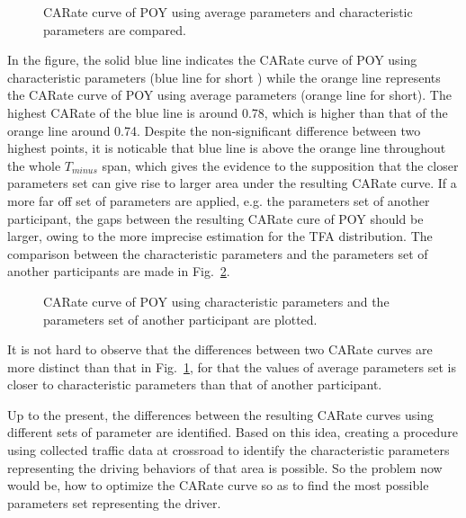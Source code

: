 \begin{figure}[htbp!]
\begin{center}
\end{center}
\caption{CARate curve of POY using average parameters and characteristic parameters are compared.}
\label{fig:CAR_comparison} 
\end{figure}


In the figure, the solid blue line indicates the CARate curve of POY using characteristic parameters (blue line for short ) while the orange line represents the CARate curve of POY using average parameters (orange line for short). The highest CARate of the blue line is around 0.78, which is higher than that of the orange line around 0.74. Despite the non-significant difference between two highest points, it is noticable that blue line is above the orange line throughout the whole $T_{minus}$ span, which gives the evidence to the supposition that the closer parameters set can give rise to larger area under the resulting CARate curve. If a more far off set of parameters are applied, e.g. the parameters set of another participant, the gaps between the resulting CARate cure of POY should be larger, owing to the more imprecise estimation for the TFA distribution. The comparison between the characteristic parameters and the parameters set of another participants are made in Fig.~\ref{fig:CAR_twoParticipants}.


\begin{figure}[htbp!]
\begin{center}
\end{center}
\caption{CARate curve of POY using characteristic parameters and the parameters set of another participant are plotted.}
\label{fig:CAR_twoParticipants} 
\end{figure}

It is not hard to observe that the differences between two CARate curves are more distinct than that in Fig.~\ref{fig:CAR_comparison}, for that the values of average parameters set is closer to characteristic parameters than that of another participant.

Up to the present, the differences between the resulting CARate curves using different sets of parameter are identified. Based on this idea, creating a procedure using collected traffic data at crossroad to identify the characteristic parameters representing the driving behaviors of that area is possible. So the problem now would be, how to optimize the CARate curve so as to find the most possible parameters set representing the driver.

